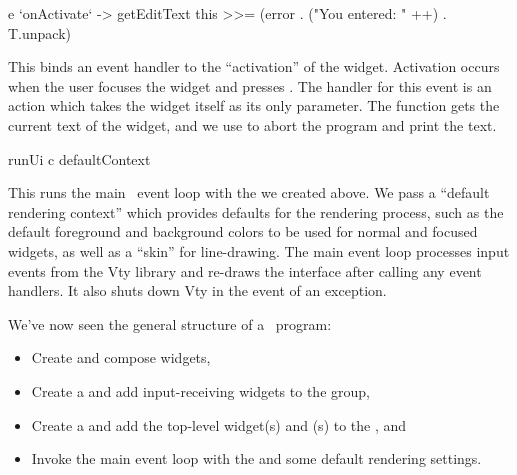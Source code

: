 \begin{haskellcode}
 e `onActivate` \this -> getEditText this >>=
   (error . ("You entered: " ++) . T.unpack)
\end{haskellcode}

This binds an event handler to the ``activation'' of the 
widget.  Activation occurs when the user focuses the  widget
and presses .  The handler for this event is an 
action which takes the  widget itself as its only parameter.
The  function gets the current text of the 
widget, and we use  to abort the program and print the text.

\begin{haskellcode}
 runUi c defaultContext
\end{haskellcode}

This runs the main \vtyui\ event loop with the  we
created above.  We pass a ``default rendering context'' which provides
defaults for the rendering process, such as the default foreground and
background colors to be used for normal and focused widgets, as well
as a “skin” for line-drawing.  The main event loop processes input
events from the Vty library and re-draws the interface after calling
any event handlers.  It also shuts down Vty in the event of an
exception.

We've now seen the general structure of a \vtyui\ program:
\begin{itemize}
\item Create and compose widgets,
\item Create a  and add input-receiving widgets to the
  group,
\item Create a  and add the top-level widget(s) and
  (s) to the , and
\item Invoke the main event loop with the  and some
  default rendering settings.
\end{itemize}
